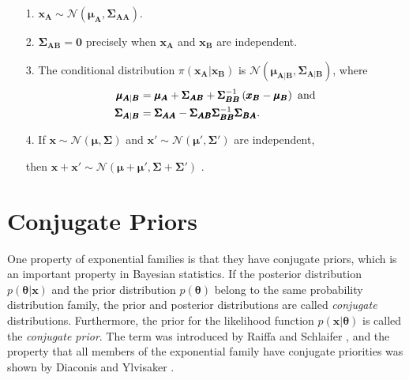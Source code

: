 \begin{itemize}
    \item[1.] $\pmb{x}_{\pmb{A}}\sim\mathcal{N}\left(\pmb{\mu}_{\pmb{A}}, \pmb{\Sigma}_{\pmb{AA}}\right)$.
    \item[2.] $\pmb{\Sigma}_{\pmb{AB}}=\pmb{0}$ precisely when $\pmb{x}_{\pmb{A}}$ and $\pmb{x}_{\pmb{B}}$ are independent.
    \item[3.] The conditional distribution $\pi\left(\pmb{x}_{\pmb{A}}|\pmb{x}_{\pmb{B}}\right)$ is $\mathcal{N}\left(\pmb{\mu}_{\pmb{A}|\pmb{B}}, \pmb{\Sigma}_{\pmb{A}|\pmb{B}}\right)$, where
    \begin{align*}
        \pmb{\mu}_{\pmb{A}|\pmb{B}} &= \pmb{\mu}_{\pmb{A}}+\pmb{\Sigma}_{\pmb{AB}}+\pmb{\Sigma}_{\pmb{BB}}^{-1}\left(\pmb{x}_{\pmb{B}}-\pmb{\mu}_{\pmb{B}}\right) \hbox{ and} \\
        \pmb{\Sigma}_{\pmb{A}|\pmb{B}} &= \pmb{\Sigma}_{\pmb{AA}}-\pmb{\Sigma}_{\pmb{AB}}\pmb{\Sigma}_{\pmb{BB}}^{-1}\pmb{\Sigma}_{\pmb{BA}}.
    \end{align*}
    \item[4.] If $\pmb{x}\sim\mathcal{N}\left(\pmb{\mu}, \pmb{\Sigma}\right)$ and $\pmb{x}'\sim\mathcal{N}\left(\pmb{\mu'}, \pmb{\Sigma'}\right)$ are independent, 
    \item[]then $\pmb{x}+\pmb{x'}\sim\mathcal{N}\left(\pmb{\mu}+ \pmb{\mu'}, \pmb{\Sigma}+ \pmb{\Sigma'}\right)$ \autocite[][19--20]{rue2005gaussian}.
\end{itemize}
\section{Conjugate Priors}
One property of exponential families is that they have conjugate priors, which is an important property in Bayesian statistics. If the posterior distribution $p\left(\pmb{\theta}|\pmb{x}\right)$ and the prior distribution $p\left(\pmb{\theta}\right)$ belong to the same probability distribution family, the prior and posterior distributions are called \textit{conjugate} distributions. Furthermore, the prior for the likelihood function $p\left(\pmb{x}|\pmb{\theta}\right)$ is called the \textit{conjugate prior}. The term was introduced by Raiffa and Schlaifer \autocite[][]{raiffaapplied}, and the property that all members of the exponential family have conjugate priorities was shown by Diaconis and Ylvisaker \autocite[][]{diaconis1979conjugate}.
